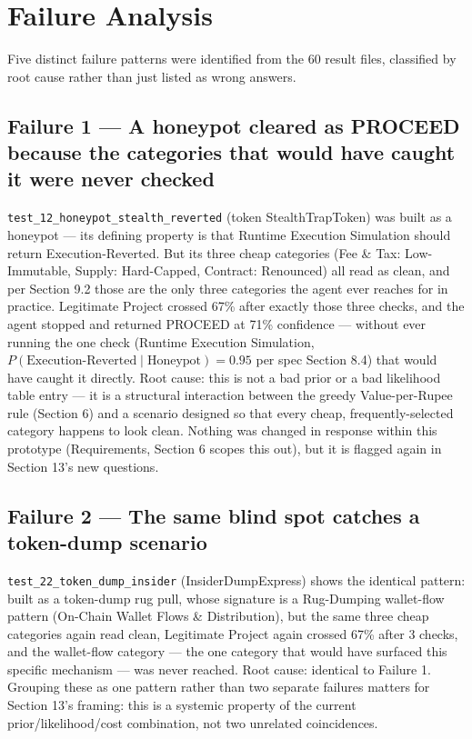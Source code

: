 \documentclass[11pt]{article}
\begin{document}
\section{Failure Analysis}

Five distinct failure patterns were identified from the 60 result files, classified by root cause rather than just listed as wrong answers.

\subsection{Failure 1 --- A honeypot cleared as PROCEED because the categories that would have caught it were never checked}

\texttt{test\_12\_honeypot\_stealth\_reverted} (token StealthTrapToken) was built as a honeypot --- its defining property is that Runtime Execution Simulation should return Execution-Reverted. But its three cheap categories (Fee \& Tax: Low-Immutable, Supply: Hard-Capped, Contract: Renounced) all read as clean, and per Section 9.2 those are the only three categories the agent ever reaches for in practice. Legitimate Project crossed 67\% after exactly those three checks, and the agent stopped and returned PROCEED at 71\% confidence --- without ever running the one check (Runtime Execution Simulation, $P(\text{Execution-Reverted}\mid\text{Honeypot})=0.95$ per spec Section 8.4) that would have caught it directly. Root cause: this is not a bad prior or a bad likelihood table entry --- it is a structural interaction between the greedy Value-per-Rupee rule (Section 6) and a scenario designed so that every cheap, frequently-selected category happens to look clean. Nothing was changed in response within this prototype (Requirements, Section 6 scopes this out), but it is flagged again in Section 13's new questions.

\subsection{Failure 2 --- The same blind spot catches a token-dump scenario}

\texttt{test\_22\_token\_dump\_insider} (InsiderDumpExpress) shows the identical pattern: built as a token-dump rug pull, whose signature is a Rug-Dumping wallet-flow pattern (On-Chain Wallet Flows \& Distribution), but the same three cheap categories again read clean, Legitimate Project again crossed 67\% after 3 checks, and the wallet-flow category --- the one category that would have surfaced this specific mechanism --- was never reached. Root cause: identical to Failure 1. Grouping these as one pattern rather than two separate failures matters for Section 13's framing: this is a systemic property of the current prior/likelihood/cost combination, not two unrelated coincidences.
\end{document}

